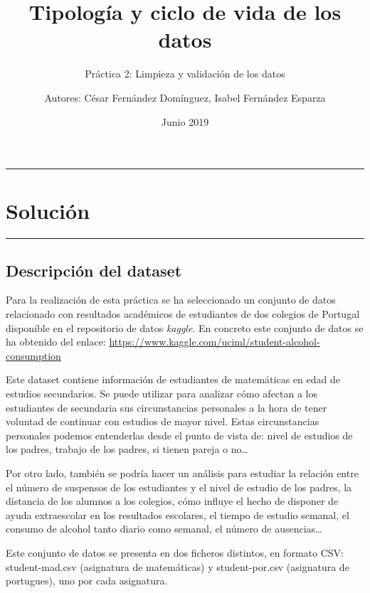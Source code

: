 \documentclass[]{article}
\title{Tipología y ciclo de vida de los datos}
\subtitle{Práctica 2: Limpieza y validación de los datos}
\author{Autores: César Fernández Domínguez, Isabel Fernández Esparza}
\date{Junio 2019}
\begin{document}
\maketitle

{
\setcounter{tocdepth}{2}
\tableofcontents
}
\begin{center}\rule{0.5\linewidth}{\linethickness}\end{center}

\hypertarget{solucion}{%
\section{Solución}\label{solucion}}

\begin{center}\rule{0.5\linewidth}{\linethickness}\end{center}

\hypertarget{descripcion-del-dataset}{%
\subsection{Descripción del dataset}\label{descripcion-del-dataset}}

Para la realización de esta práctica se ha seleccionado un conjunto de
datos relacionado con resultados académicos de estudiantes de dos
colegios de Portugal disponible en el repositorio de datos
\emph{kaggle}. En concreto este conjunto de datos se ha obtenido del
enlace: \url{https://www.kaggle.com/uciml/student-alcohol-consumption}

Este dataset contiene información de estudiantes de matemáticas en edad
de estudios secundarios. Se puede utilizar para analizar cómo afectan a
los estudiantes de secundaria sus circunstancias personales a la hora de
tener voluntad de continuar con estudios de mayor nivel. Estas
circunstancias personales podemos entenderlas desde el punto de vista
de: nivel de estudios de los padres, trabajo de los padres, si tienen
pareja o no\ldots{}

Por otro lado, también se podría hacer un análisis para estudiar la
relación entre el número de suspensos de los estudiantes y el nivel de
estudio de los padres, la distancia de los alumnos a los colegios, cómo
influye el hecho de disponer de ayuda extraescolar en los resultados
escolares, el tiempo de estudio semanal, el consumo de alcohol tanto
diario como semanal, el número de ausencias\ldots{}

Este conjunto de datos se presenta en dos ficheros distintos, en formato
CSV: student-mad.csv (asignatura de matemáticas) y student-por.csv
(asignatura de portugues), uno por cada asignatura.
\end{document}
